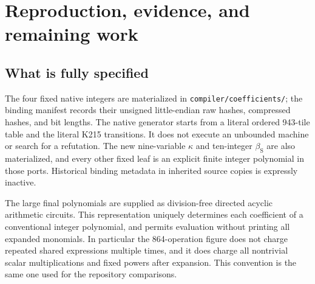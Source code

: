 \section{Reproduction, evidence, and remaining work}
\label{sec:verification}

\subsection{What is fully specified}

The four fixed native integers are materialized in
\texttt{compiler/coefficients/}; the binding manifest records their
unsigned little-endian raw hashes, compressed hashes, and bit lengths.
The native generator starts from a literal ordered 943-tile table and
the literal K215 transitions. It does not execute an unbounded machine
or search for a refutation. The new nine-variable $\kappa$ and
ten-integer $\beta_{\mathrm S}$ are also materialized, and every
other fixed leaf is an explicit finite integer polynomial in those
ports. Historical binding metadata in inherited source copies is
expressly inactive.

The large final polynomials are supplied as division-free directed
acyclic arithmetic circuits. This representation uniquely determines
each coefficient of a conventional integer polynomial, and permits
evaluation without printing all expanded monomials. In particular the
864-operation figure does not charge repeated shared expressions
multiple times, and it does charge all nontrivial scalar multiplications
and fixed powers after expansion. This convention is the same one
used for the repository comparisons.


